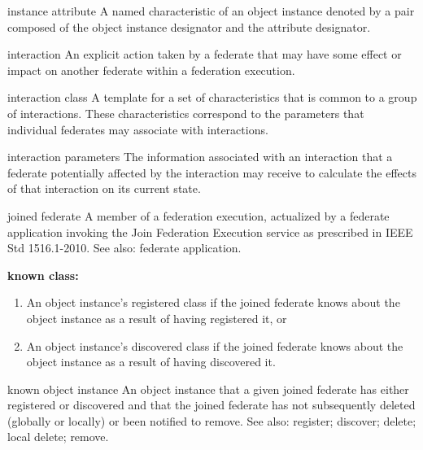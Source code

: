 \begin{definition}{instance attribute}
    A named characteristic of an object instance denoted by a pair composed of the object instance designator and the attribute designator.
\end{definition}

\newpage
\begin{definition}{interaction}
    An explicit action taken by a federate that may have some effect or impact on another federate within a federation execution.
\end{definition}

\begin{definition}{interaction class}
    A template for a set of characteristics that is common to a group of interactions. These characteristics correspond to the parameters that individual federates may associate with interactions.
\end{definition}

\begin{definition}{interaction parameters}
    The information associated with an interaction that a federate potentially affected by the interaction may receive to calculate the effects of that interaction on its current state.
\end{definition}

\begin{definition}{joined federate}
    A member of a federation execution, actualized by a federate application invoking the Join Federation Execution service as prescribed in IEEE Std 1516.1-2010. See also: federate application.
\end{definition}

\par\noindent\textbf{known class:}\par

\begin{enumerate}[label=\alph*)]
\item An object instance's registered class if the joined federate knows about the object instance as a result of having registered it, or
\item An object instance's discovered class if the joined federate knows about the object instance as a result of having discovered it.
\end{enumerate}

\begin{definition}{known object instance}
    An object instance that a given joined federate has either registered or discovered and that the joined federate has not subsequently deleted (globally or locally) or been notified to remove. See also: register; discover; delete; local delete; remove.
\end{definition}

